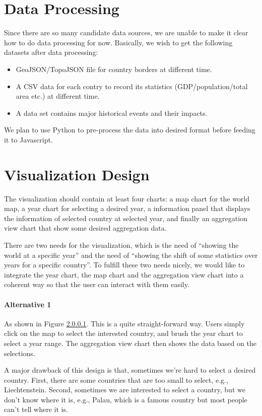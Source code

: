 \documentclass[12pt, fullpage,letterpaper]{article}
\begin{document}
\section{Data Processing}
Since there are so many candidate data sources, we are unable to make it clear how to do data processing for now.
Basically, we wish to get the following datasets after data processing:
\begin{itemize}
    \item GeoJSON/TopoJSON file for country borders at different time.
    \item A CSV data for each contry to record its statistics (GDP/population/total area etc.) at different time.
    \item A data set contains major historical events and their impacts.
\end{itemize}

We plan to use Python to pre-process the data into desired format before feeding it to Javascript.

\section{Visualization Design}

The visualization should contain at least four charts: a map chart for the world map, a year chart for selecting a desired year, a information panel that displays the information
of selected country at selected year, and finally an aggregation view chart that show some desired aggregation data.

There are two needs for the visualization, which is the need of  ``showing the world at a specific year'' and the need of ``showing the shift of some statistics over years for a specific country''.
To fulfill these two needs nicely, we would like to integrate the year chart, the map chart and the aggregation view chart into a coherent way so that the user can interact with them easily.

\paragraph{Alternative 1}
As shown in Figure \ref{}. 
This is a quite straight-forward way.
Users simply click on the map to select the interested country,
and brush the year chart to select a year range.
The aggregation view chart then shows the data based on the selections.

A major drawback of this design is that, sometimes we're hard to select a desired country.
First, there are some countries that are too small to select, e.g., Liechtenstein. Second, sometimes we are interested to select
a country, but we don't know where it is, e.g., Palau, which is a famous country but most people can't tell where it is.
\end{document}

